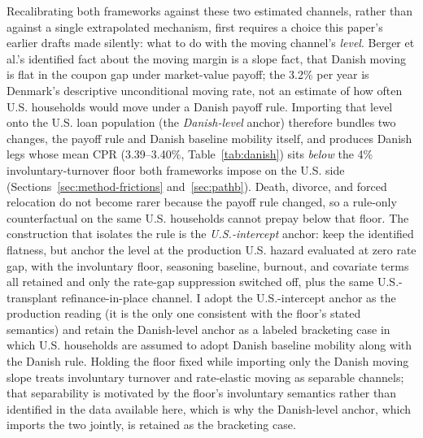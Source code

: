 \documentclass[12pt]{article}
\begin{document}
Recalibrating both frameworks against these two estimated channels, rather than against a single extrapolated mechanism, first requires a choice this paper's earlier drafts made silently: what to do with the moving channel's \emph{level}. Berger et al.'s identified fact about the moving margin is a slope fact, that Danish moving is flat in the coupon gap under market-value payoff; the 3.2\% per year is Denmark's descriptive unconditional moving rate, not an estimate of how often U.S. households would move under a Danish payoff rule. Importing that level onto the U.S. loan population (the \emph{Danish-level} anchor) therefore bundles two changes, the payoff rule and Danish baseline mobility itself, and produces Danish legs whose mean CPR (3.39--3.40\%, Table~\ref{tab:danish}) sits \emph{below} the 4\% involuntary-turnover floor both frameworks impose on the U.S. side (Sections~\ref{sec:method-frictions} and~\ref{sec:pathb}). Death, divorce, and forced relocation do not become rarer because the payoff rule changed, so a rule-only counterfactual on the same U.S. households cannot prepay below that floor. The construction that isolates the rule is the \emph{U.S.-intercept} anchor: keep the identified flatness, but anchor the level at the production U.S. hazard evaluated at zero rate gap, with the involuntary floor, seasoning baseline, burnout, and covariate terms all retained and only the rate-gap suppression switched off, plus the same U.S.-transplant refinance-in-place channel. I adopt the U.S.-intercept anchor as the production reading (it is the only one consistent with the floor's stated semantics) and retain the Danish-level anchor as a labeled bracketing case in which U.S. households are assumed to adopt Danish baseline mobility along with the Danish rule. Holding the floor fixed while importing only the Danish moving slope treats involuntary turnover and rate-elastic moving as separable channels; that separability is motivated by the floor's involuntary semantics rather than identified in the data available here, which is why the Danish-level anchor, which imports the two jointly, is retained as the bracketing case.
\end{document}
